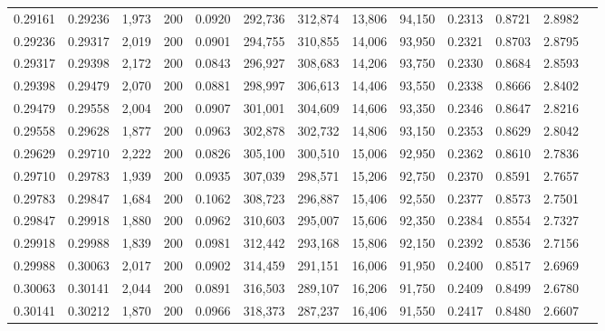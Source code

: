 \begin{tabular}{rrrrrrrrrrrrr}
0.29161 & 0.29236 &  1,973 & 200 &                                     0.0920 & 292,736 & 312,874 &  13,806 &  94,150 & 0.2313 & 0.8721 & 2.8982 \\
0.29236 & 0.29317 &  2,019 & 200 &                                     0.0901 & 294,755 & 310,855 &  14,006 &  93,950 & 0.2321 & 0.8703 & 2.8795 \\
0.29317 & 0.29398 &  2,172 & 200 &                                     0.0843 & 296,927 & 308,683 &  14,206 &  93,750 & 0.2330 & 0.8684 & 2.8593 \\
0.29398 & 0.29479 &  2,070 & 200 &                                     0.0881 & 298,997 & 306,613 &  14,406 &  93,550 & 0.2338 & 0.8666 & 2.8402 \\
0.29479 & 0.29558 &  2,004 & 200 &                                     0.0907 & 301,001 & 304,609 &  14,606 &  93,350 & 0.2346 & 0.8647 & 2.8216 \\
0.29558 & 0.29628 &  1,877 & 200 &                                     0.0963 & 302,878 & 302,732 &  14,806 &  93,150 & 0.2353 & 0.8629 & 2.8042 \\
0.29629 & 0.29710 &  2,222 & 200 &                                     0.0826 & 305,100 & 300,510 &  15,006 &  92,950 & 0.2362 & 0.8610 & 2.7836 \\
0.29710 & 0.29783 &  1,939 & 200 &                                     0.0935 & 307,039 & 298,571 &  15,206 &  92,750 & 0.2370 & 0.8591 & 2.7657 \\
0.29783 & 0.29847 &  1,684 & 200 &                                     0.1062 & 308,723 & 296,887 &  15,406 &  92,550 & 0.2377 & 0.8573 & 2.7501 \\
0.29847 & 0.29918 &  1,880 & 200 &                                     0.0962 & 310,603 & 295,007 &  15,606 &  92,350 & 0.2384 & 0.8554 & 2.7327 \\
0.29918 & 0.29988 &  1,839 & 200 &                                     0.0981 & 312,442 & 293,168 &  15,806 &  92,150 & 0.2392 & 0.8536 & 2.7156 \\
0.29988 & 0.30063 &  2,017 & 200 &                                     0.0902 & 314,459 & 291,151 &  16,006 &  91,950 & 0.2400 & 0.8517 & 2.6969 \\
0.30063 & 0.30141 &  2,044 & 200 &                                     0.0891 & 316,503 & 289,107 &  16,206 &  91,750 & 0.2409 & 0.8499 & 2.6780 \\
0.30141 & 0.30212 &  1,870 & 200 &                                     0.0966 & 318,373 & 287,237 &  16,406 &  91,550 & 0.2417 & 0.8480 & 2.6607 \\

\end{tabular}
